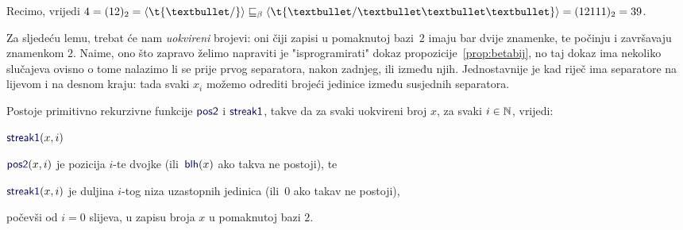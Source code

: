 \begin{primjer}
Recimo, vrijedi $4=(12)_2=\kr{\t{\textbullet/}}\sqsubseteq_\beta\kr{\t{\textbullet/\textbullet\textbullet\textbullet}}=(12111)_2=39$.
\end{primjer}

Za sljedeću lemu, trebat će nam \emph{uokvireni} brojevi: oni čiji zapisi u pomaknutoj bazi~$2$ imaju bar dvije znamenke, te počinju i završavaju znamenkom $2$. Naime, ono što zapravo želimo napraviti je "isprogramirati" dokaz propozicije~\ref{prop:betabij}, no taj dokaz ima nekoliko slučajeva ovisno o tome nalazimo li se prije prvog separatora, nakon zadnjeg, ili između njih. Jednostavnije je kad riječ ima separatore na lijevom i na desnom kraju: tada svaki $x_i$ možemo odrediti brojeći jedinice između susjednih separatora.

\begin{lema}\label{lm:pos2streak1prn}
Postoje primitivno rekurzivne funkcije $\f{pos2}$ i $\f{streak1}$, takve da za svaki uokvireni broj $x$, za svaki $i\in{\mathbb N}$, vrijedi:
\begin{labeling}{$\f{streak1}(x,i)$}
    \item[$\f{pos2}(x,i)$] je pozicija $i$-te dvojke (ili\, $\f{blh}(x)$ ako takva ne postoji), te
    \item[$\f{streak1}(x,i)$] je duljina $i$-tog niza uzastopnih jedinica (ili\, $0$ ako takav ne postoji),
\end{labeling}
počevši od $i=0$ slijeva, u zapisu broja $x$ u pomaknutoj bazi $2$.
\end{lema}
